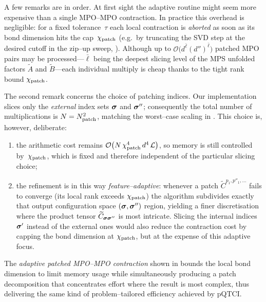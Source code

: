 A few remarks are in order. At first sight the adaptive routine might seem more expensive than a single MPO--MPO contraction.  In practice this overhead is negligible: for a fixed tolerance~$\tau$ each local contraction is \emph{aborted} as soon as its bond dimension hits the cap~$\chi_{\text{patch}}$ (e.g.\ by truncating 
the SVD step at the desired cutoff in the zip--up sweep, ). Although up to
\(\mathcal{O} \bigl(d^{\bar\ell}(d'')^{\bar\ell}\bigr)\) patched MPO pairs may be
processed---\(\bar\ell\) being the deepest slicing level of the MPS unfolded factors $\widetilde{A}$ and $\widetilde{B}$---each individual multiply is cheap thanks to the tight rank bound $\chi_{\text{patch}}$.

The second remark concerns the choice of patching indices. Our implementation slices only the \emph{external} index sets \(\boldsymbol{\sigma}\) and \(\boldsymbol{\sigma}''\); consequently the total number of multiplications is \(N=N_{\text{patch}}^{2}\), matching the worst--case scaling in .  This choice is,
however, deliberate:  
\begingroup
\renewcommand{\labelenumi}{(\alph{enumi})}
\begin{enumerate}
  \item the arithmetic cost remains
        \(\mathcal{O} \bigl(N\,\chi_{\text{patch}}^{4}\,d^{4}\,\mathcal{L} \bigr)\), so memory is still controlled by~\(\chi_{\text{patch}}\), which is fixed and therefore independent of the particular slicing choice;
  \item the refinement is in this way \emph{feature--adaptive}: whenever a patch  \(\widetilde{C}^{p_1,p''_1,\dots}\) fails to converge (its local rank exceeds \(\chi_{\text{patch}}\)) the algorithm subdivides exactly that output configuration space $(\boldsymbol{\sigma}, \boldsymbol{\sigma}'')$ region, yielding a finer discretisation where the product tensor \(\widetilde{C}_{\boldsymbol{\sigma} \boldsymbol{\sigma}''}\) is most intricate. Slicing the internal indices \(\boldsymbol{\sigma}'\) instead of the external ones would also reduce the contraction cost by capping the bond dimension at $\chi_{\text{patch}}$, but at the expense of this adaptive focus.
\end{enumerate}
\endgroup

The \emph{adaptive patched MPO--MPO contraction} shown in  bounds the local bond dimension to limit memory usage while simultaneously producing a patch decomposition that concentrates effort where the result is most complex, thus delivering the same kind of problem--tailored efficiency achieved by pQTCI.



